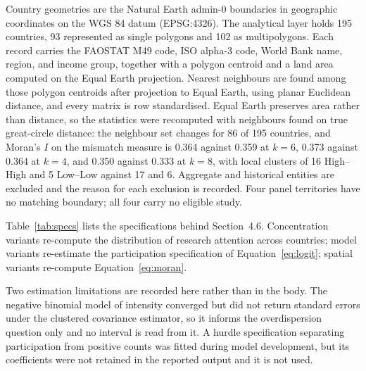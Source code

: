 \documentclass[ASNA,twocolumn]{USG}
\makeatletter
\newcommand{\applabel}[2]{\phantomsection\edef\@currentlabel{#1}\label{#2}}
\makeatother
\begin{document}
Country geometries are the Natural Earth admin-0 boundaries in geographic coordinates on the
WGS 84 datum (EPSG:4326). The analytical layer holds 195 countries, 93 represented as single
polygons and 102 as multipolygons. Each record carries the FAOSTAT M49 code, ISO alpha-3 code, World Bank name, region, and income
group, together with a polygon centroid and a land area computed on the Equal Earth projection.
Nearest neighbours are found among those polygon centroids after projection to Equal Earth, using
planar Euclidean distance, and every matrix is row standardised. Equal Earth preserves area
rather than distance, so the statistics were recomputed with neighbours found on true
great-circle distance: the neighbour set changes for 86 of 195 countries, and Moran's $I$ on the
mismatch measure is 0.364 against 0.359 at $k=6$, 0.373 against 0.364 at $k=4$, and 0.350 against
0.333 at $k=8$, with local clusters of 16 High--High and 5 Low--Low against 17 and 6. Aggregate and historical entities are excluded
and the reason for each exclusion is recorded. Four panel territories have no matching
boundary; all four carry no eligible study.



\applabel{Appendix D}{app:robust}

Table~\ref{tab:specs} lists the specifications behind Section~4.6. Concentration variants
re-compute the distribution of research attention across countries; model variants re-estimate
the participation specification of Equation~\eqref{eq:logit}; spatial variants re-compute
Equation~\eqref{eq:moran}.

Two estimation limitations are recorded here rather than in the body. The negative binomial
model of intensity converged but did not return standard errors under the clustered covariance
estimator, so it informs the overdispersion question only and no interval is read from it. A
hurdle specification separating participation from positive counts was fitted during model
development, but its coefficients were not retained in the reported output and it is not used.
\end{document}
